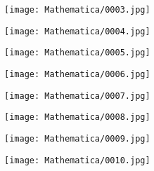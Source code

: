 \documentclass[13pt]{article}
\begin{document}
\begin{figure}[H]
    \centering
    \texttt{[image: Mathematica/0003.jpg]}
\end{figure}

\begin{figure}[H]
    \centering
    \texttt{[image: Mathematica/0004.jpg]}
\end{figure}

\begin{figure}[H]
    \centering
    \texttt{[image: Mathematica/0005.jpg]}
\end{figure}

\begin{figure}[H]
    \centering
    \texttt{[image: Mathematica/0006.jpg]}
\end{figure}

\begin{figure}[H]
    \centering
    \texttt{[image: Mathematica/0007.jpg]}
\end{figure}

\begin{figure}[H]
    \centering
    \texttt{[image: Mathematica/0008.jpg]}
\end{figure}

\begin{figure}[H]
    \centering
    \texttt{[image: Mathematica/0009.jpg]}
\end{figure}

\begin{figure}[H]
    \centering
    \texttt{[image: Mathematica/0010.jpg]}
\end{figure}
\end{document}
